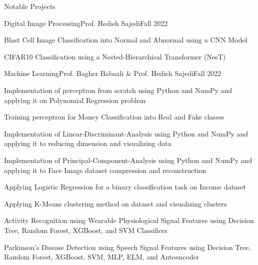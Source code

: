 \documentclass[]{main}
\begin{document}
\begin{section}{Notable Projects}
\begin{subsection}{Digital Image Processing}{Prof. Hedieh Sajedi}{Fall 2022}{}
        \item Blast Cell Image Classification into Normal and Abnormal using a CNN Model \;\href{https://github.com/ckoliber/dipexercises/blob/main/src/exercise2.ipynb}{\faExternalLink*}
        \item CIFAR10 Classification using a Nested-Hierarchical Transformer (NesT) \;\href{https://github.com/ckoliber/dipexercises/blob/main/src/project.ipynb}{\faExternalLink*}
        \end{subsection}
\begin{subsection}{Machine Learning}{Prof. Bagher Babaali \& Prof. Hedieh Sajedi}{Fall 2022}{}
        \item Implementation of perceptron from scratch using Python and NumPy and applying it on Polynomial Regression problem \;\href{https://github.com/ckoliber/mlexercises/blob/master/src/exercise1.ipynb}{\faExternalLink*}
        \item Training perceptron for Money Classification into Real and Fake classes \;\href{https://github.com/ckoliber/mlexercises/blob/master/src/exercise2.ipynb}{\faExternalLink*}
        \item Implementation of Linear-Discriminant-Analysis using Python and NumPy and applying it to reducing dimension and visualizing data \;\href{https://github.com/ckoliber/mlexercises/blob/master/src/exercise3.ipynb}{\faExternalLink*}
        \item Implementation of Principal-Component-Analysis using Python and NumPy and applying it to Face Image dataset compression and reconstruction \;\href{https://github.com/ckoliber/mlexercises/blob/master/src/exercise4.ipynb}{\faExternalLink*}
        \item Applying Logistic Regression for a binary classification task on Income dataset \;\href{https://github.com/ckoliber/mlexercises/blob/master/src/exercise5.ipynb}{\faExternalLink*}
        \item Applying K-Means clustering method on dataset and visualizing clusters \;\href{https://github.com/ckoliber/mlexercises/blob/master/src/exercise6.ipynb}{\faExternalLink*}
        \item Activity Recognition using Wearable Physiological Signal Features using Decision Tree, Random Forest, XGBoost, and SVM Classifiers \;\href{https://github.com/ckoliber/mlexercises/blob/master/src/exercise1_1.ipynb}{\faExternalLink*}
        \item Parkinson's Disease Detection using Speech Signal Features using Decision Tree, Random Forest, XGBoost, SVM, MLP, ELM, and Autoencoder \;\href{https://github.com/ckoliber/mlexercises/blob/master/src/exercise2_1.ipynb}{\faExternalLink*}

\end{subsection}
\end{section}
\end{document}
